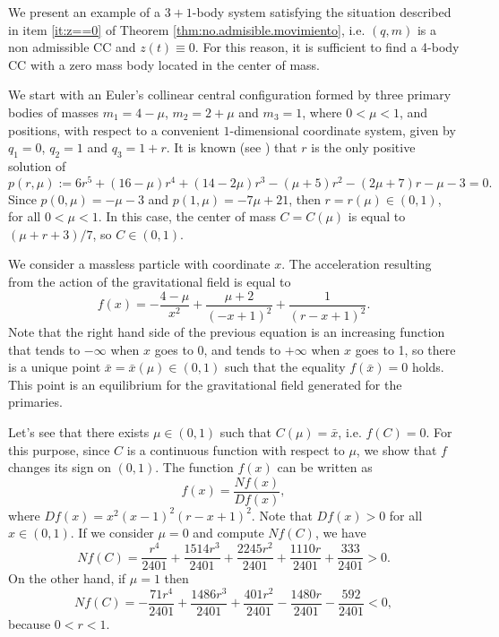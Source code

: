 \documentclass[smallcondensed]{svjour3}
\begin{document}
\begin{example}
 We present an example of a $3+1$-body system satisfying the situation described in  item \ref{it:z==0} of Theorem \ref{thm:no.admisible.movimiento}, i.e. $(q,m)$ is a non admissible CC and $z(t)\equiv 0$. For this reason, it is sufficient to find a 4-body CC with a zero mass body located in the center of mass.

 We start with an Euler's collinear central configuration formed by three primary bodies of masses $m_1 = 4-\mu$, $m_2 = 2 + \mu$ and $m_3 = 1$, where $0<\mu<1$, and positions, with respect to a convenient $1$-dimensional coordinate system,  given by $q_1 = 0$, $q_2 = 1$ and $q_3 = 1 + r$. It is known (see \cite{Moeckel:2014}) that $r$ is the only positive solution of
\[
p(r,\mu):=6 r^{5} +\left(16- \mu \right) r^{4}  +  \left( 14- 2 \mu \right) r^{3}- \left( \mu + 5\right)  r^{2}-\left( 2 \mu + 7\right) r - \mu - 3=0.
\]
Since  $p(0,\mu)=-\mu-3$ and $p(1,\mu)=-7\mu+21$, then $r=r(\mu)\in (0,1)$, for all $0<\mu<1$.
In this case, the center of mass $C=C(\mu)$ is equal to $(\mu+r+3)/7$, so $C\in (0,1)$.

We consider a massless particle with coordinate $x$. The acceleration resulting from the action of the gravitational field is equal to
\[
f(x)= - \frac{4-\mu }{x^{2}}+\frac{\mu + 2}{\left(- x + 1\right)^{2}} + \frac{1}{\left(r - x + 1\right)^{2}}.
\]
Note that the right hand side of the previous equation is an increasing function that tends to $-\infty$ when $x$ goes to 0, and tends to $+\infty$ when $x$ goes to 1, so there is a unique point $\bar{x}=\bar{x}(\mu)\in (0,1)$ such that the equality $f(\bar{x})=0$ holds. This point is an equilibrium for the gravitational field generated for the primaries.

Let's see that there exists $ \mu \in (0,1) $ such that $ C(\mu) = \bar{x} $, i.e. $f(C)=0$. For this purpose, since $C$ is a continuous function with respect to $\mu$,  we show that $f$ changes its sign on  $(0,1)$.  The function $f(x)$ can be written as $$f(x)=\frac{Nf(x)}{Df(x)},$$ where $Df(x)=x^{2} \left(x - 1\right)^{2} \left(r - x + 1\right)^{2}$. Note that  $Df(x)>0$ for all $x\in (0,1)$. If we consider $\mu=0$ and compute $Nf(C)$, we have 
\[Nf(C)=\frac{r^{4}}{2401} + \frac{1514 r^{3}}{2401} + \frac{2245 r^{2}}{2401} + \frac{1110 r}{2401} + \frac{333}{2401}>0.\]
On the other hand, if  $\mu=1$ then
\[Nf(C)=- \frac{71 r^{4}}{2401} + \frac{1486 r^{3}}{2401} + \frac{401 r^{2}}{2401} - \frac{1480 r}{2401} - \frac{592}{2401}<0,\]
because $0<r<1$.
\end{example}
\end{document}
